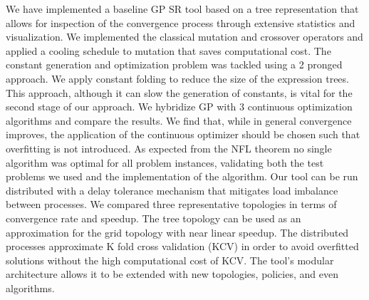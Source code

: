 
We have implemented a baseline GP SR tool based on a tree representation that allows for inspection of the convergence process through extensive statistics and visualization. We implemented the classical mutation and crossover operators and applied a cooling schedule to mutation that saves computational cost. 
The constant generation and optimization problem was tackled using a 2 pronged approach. We apply constant folding to reduce the size of the expression trees. This approach, although it can slow the generation of constants, is vital for the second stage of our approach. We hybridize GP with 3 continuous optimization algorithms and compare the results. We find that, while in general convergence improves, the application of the continuous optimizer should be chosen such that overfitting is not introduced.
As expected from the NFL theorem no single algorithm was optimal for all problem instances, validating both the test problems we used and the implementation of the algorithm.
Our tool can be run distributed with a delay tolerance mechanism that mitigates load imbalance between processes. We compared three representative topologies in terms of convergence rate and speedup. The tree topology can be used as an approximation for the grid topology with near linear speedup. 
The distributed processes approximate K fold cross validation (KCV) in order to avoid overfitted solutions without the high computational cost of KCV. 
The tool's modular architecture allows it to be extended with new topologies, policies, and even algorithms. 